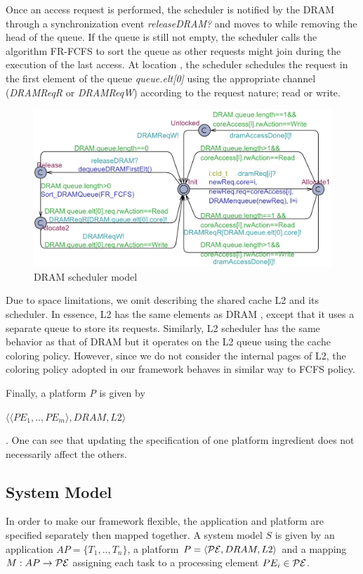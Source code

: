 Once an access request is performed, the scheduler is notified by the DRAM through a synchronization event \emph{releaseDRAM?} and moves to  while removing the head of the queue. If the queue is still not empty, the scheduler calls the algorithm FR-FCFS to sort the queue as other requests might join during the execution of the last access. At location , the scheduler schedules the request in the first element of the queue \emph{queue.elt[0]} using the appropriate channel (\emph{DRAMReqR} or \emph{DRAMReqW}) according to the request nature; read or write.  

\begin{figure}[htb]
\centering
\vspace{-3mm}
\caption{DRAM scheduler model}
\label{fig:dramsched}
\includegraphics[scale=0.41]{DRAMScheduler.pdf}
\vspace{-3mm}
\end{figure}

Due to space limitations, we omit describing the shared cache L2 and its scheduler. In essence, L2 has the same elements as DRAM , except that it uses a separate queue to store its requests. Similarly, L2 scheduler has the same behavior as that of DRAM but it operates on the L2 queue using the cache coloring policy. However, since we do not consider the internal pages of L2, the coloring policy adopted in our framework behaves in similar way to FCFS policy.

Finally, a platform \emph{P} is given by \begin{footnotesize}\emph{$\langle \langle PE_1, .., PE_m \rangle, DRAM, L2\rangle$}\end{footnotesize}. One can see that updating the specification of one platform ingredient does not necessarily affect the others. %

\subsection{System Model}
In order to make our framework flexible, the application and platform are specified separately then mapped together. A system model $S$ is given by an application \emph{$AP=\{T_1,..,T_n\}$}, a platform \emph{$P=\langle {\cal PE}, DRAM, L2\rangle$} and a mapping \emph{$M:AP \rightarrow {\cal PE}$} assigning each task to a processing element \emph{$PE_i \in {\cal PE}$}. %

